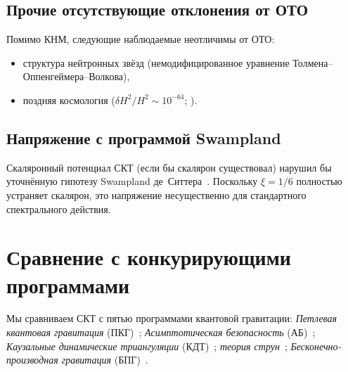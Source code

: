 \documentclass[12pt,a4paper]{article}
\theoremstyle{plain}
\theoremstyle{definition}
\theoremstyle{remark}
\begin{document}
{{{{{{\subsection{Прочие отсутствующие отклонения от ОТО}
\label{sec:astro_other}

Помимо КНМ, следующие наблюдаемые неотличимы от ОТО:
\begin{itemize}
\item структура нейтронных звёзд (немодифицированное уравнение Толмена--Оппенгеймера--Волкова),
\item поздняя космология ($\delta H^2/H^2 \sim 10^{-64}$;
  \cite{Alfyorov:2026paper4}).
\end{itemize}

\subsection{Напряжение с программой Swampland}
\label{sec:swampland}

Скаляронный потенциал СКТ (если бы скалярон существовал) нарушил бы
уточнённую гипотезу Swampland де~Ситтера~\cite{Obied:2018}.
Поскольку $\xi = 1/6$ полностью устраняет скалярон, это напряжение
несущественно для стандартного спектрального действия.

\section{Сравнение с конкурирующими программами}
\label{sec:comparison}

Мы сравниваем СКТ с пятью программами квантовой гравитации:
\emph{Петлевая квантовая гравитация}
(ПКГ)~\cite{Rovelli:2004,Thiemann:2007};
\emph{Асимптотическая безопасность}
(АБ)~\cite{ReuterSaueressig:2012};
\emph{Каузальные динамические триангуляции}
(КДТ)~\cite{AJL:2012};
\emph{теория струн}~\cite{Polchinski:1998};
\emph{Бесконечно-производная гравитация}
(БПГ)~\cite{BMS:2006,Modesto:2012}.

}}}}}}
\end{document}
